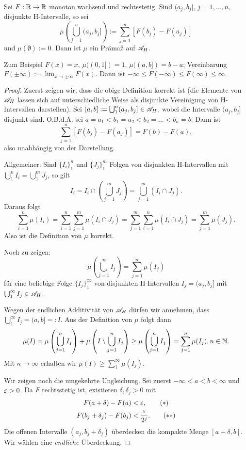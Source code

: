 \begin{lem}
 Sei $F: \mathbb{R} \to \mathbb{R}$ monoton wachsend und rechtsstetig\footnotemark. Sind
 $(a_j, b_j]$, $j= 1, \ldots, n$, disjunkte H-Intervalle, so sei
 \[ \mu \left( \bigcup_{j=1}^n (a_j, b_j] \right) := \sum_{j=1}^n [ F(b_j) - F(a_j) ] \]
 und $\mu( \emptyset ) := 0$. Dann ist $\mu$ ein Prämaß auf $\mathscr{A}_H$.
\end{lem} 

Zum Beispiel $F(x) = x$, $\mu( (0,1] ) = 1$, $\mu( (a,b] ) = b - a$;
Vereinbarung $F( \pm \infty ) := \lim_{x \to \pm \infty} F(x)$. Dann ist $-
\infty \le F(-\infty) \le F(\infty) \le \infty$. 

\begin{proof}
 Zuerst zeigen wir, dass die obige Definition korrekt ist (die Elemente von
 $\mathscr{A}_H$ lassen sich auf unterschiedliche Weise als disjunkte Vereinigung von
 H-Intervallen darstellen). Sei $(a,b] := \bigcup_1^n (a_j, b_j] \in \mathscr{A}_H$,
 wobei die Intervalle $(a_j, b_j]$ disjunkt sind. O.B.d.A. sei $a = a_1 < b_1 =
 a_2 < b_2 = \ldots < b_n = b$. Dann ist 
 \[ \sum_{j=1}^n [ F( b_j ) - F(a_j) ] = F(b) - F(a), \]
 also unabhängig von der Darstellung. 
 
 Allgemeiner: Sind $\{ I_i \}_1^n$ und $\{ J_j \}_1^m$ Folgen von disjunkten
 H-Intervallen mit $\bigcup_1^n I_i = \bigcup_1^m J_j$, so gilt
 \[ I_i = I_i \cap \left( \bigcup_{j=1}^m J_j \right) = \bigcup_{j=1}^m ( I_i \cap J_j ). \]
 Daraus folgt
 \[ \sum_{i=1}^n \mu(I_i) = \sum_{i=1}^n \sum_{j=1}^m \mu( I_i \cap J_j ) = \sum_{j=1}^m \sum_{i=1}^n \mu( I_i \cap J_j ) =  \sum_{j=1}^m \mu(J_j). \]
 Also ist die Definition von $\mu$ korrekt.
 
 Noch zu zeigen:
 \[ \mu \left( \bigcup_{j=1}^\infty I_j \right) = \sum_{j=1}^\infty \mu(I_j) \]
 für eine beliebige Folge $\{ I_j \}_1^\infty$ von disjunkten H-Intervallen $I_j
 = (a_j, b_j]$ mit $\bigcup_1^\infty I_j \in \mathscr{A}_H$.
 
 Wegen der endlichen Additivität von $\mathscr{A}_H$ dürfen wir annehmen, dass
 $\bigcup_1^\infty I_j = (a,b] =: I$. Aus der Definition von $\mu$ folgt dann
 \[ \mu(I) = \mu \left( \bigcup_{j=1}^n I_j \right) + \mu \left( I \setminus \bigcup_{j=1}^n I_j \right)
    \ge \mu\left( \bigcup_{j=1}^n I_j \right) = \sum_{j=1}^n \mu( I_j ), n \in \mathbb{N}. \]
 Mit $n \to \infty$ erhalten wir $\mu(I) \ge \sum_1^\infty \mu( I_j )$. 
 
 Wir zeigen noch die umgekehrte Ungleichung. Sei zuerst $- \infty < a < b <
 \infty $ und $\varepsilon > 0$. Da $F$ rechtsstetig ist, existieren $\delta, \delta_j
 > 0$ mit
 \begin{align*}
    F( a + \delta ) - F(a) &< \varepsilon, \tag{$*$} \\
    F(b_j + \delta_j) - F(b_j) &< \frac{\varepsilon}{2^j}. \tag{$**$}
 \end{align*}
 Die offenen Intervalle $(a_j, b_j + \delta_j)$ überdecken die kompakte Menge
 $[a + \delta, b]$. Wir wählen eine \emph{endliche} Überdeckung.
 

\end{proof}
